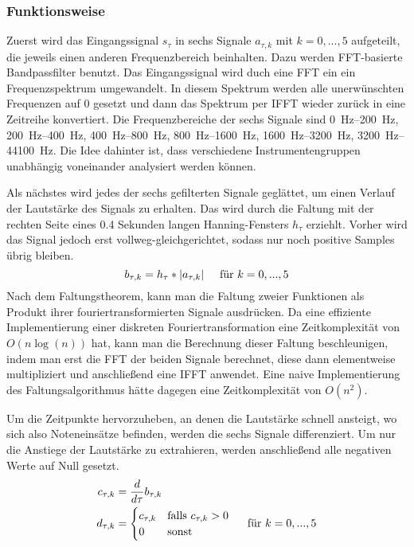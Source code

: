 {{		\subsubsection*{Funktionsweise}
		{
			Zuerst wird das Eingangssignal $s_\tau$ in sechs Signale $a_{\tau, k}$ mit $k = 0, ..., 5$ aufgeteilt,
				die jeweils einen anderen Frequenzbereich beinhalten.
			Dazu werden FFT-basierte Bandpassfilter benutzt.
			Das Eingangssignal wird duch eine FFT ein ein Frequenzspektrum umgewandelt.
			In diesem Spektrum werden alle unerwünschten Frequenzen auf \num{0} gesetzt
				und dann das Spektrum per IFFT wieder zurück in eine Zeitreihe konvertiert.
			Die Frequenzbereiche der sechs Signale sind
				\SIrange{0}{200}{\hertz}, \SIrange{200}{400}{\hertz},
				\SIrange{400}{800}{\hertz}, \SIrange{800}{1600}{\hertz},
				\SIrange{1600}{3200}{\hertz}, \SIrange{3200}{44100}{\hertz}.
			Die Idee dahinter ist,
				dass verschiedene Instrumentengruppen unabhängig voneinander analysiert werden können.

			Als nächstes wird jedes der sechs gefilterten Signale geglättet,
				um einen Verlauf der Lautstärke des Signals zu erhalten.
			Das wird durch die Faltung mit der rechten Seite eines \num{0.4} Sekunden langen Hanning-Fensters $h_\tau$ erziehlt.
			Vorher wird das Signal jedoch erst vollweg-gleichgerichtet,
				sodass nur noch positive Samples übrig bleiben.
			\begin{equation}
				b_{\tau, k} = h_\tau * |a_{\tau, k}| \text{\hspace{5mm}für } k = 0, ..., 5
			\end{equation}
			Nach dem Faltungstheorem,
				kann man die Faltung zweier Funktionen als Produkt ihrer fouriertransformierten Signale ausdrücken.
			Da eine effiziente Implementierung einer diskreten Fouriertransformation eine Zeitkomplexität von $O(n\log(n))$ hat,
				kann man die Berechnung dieser Faltung beschleunigen,
				indem man erst die FFT der beiden Signale berechnet,
				diese dann elementweise multipliziert
				und anschlie{\ss}end eine IFFT anwendet.
			Eine naive Implementierung des Faltungsalgorithmus hätte dagegen eine Zeitkomplexität von $O(n^2)$.

			Um die Zeitpunkte hervorzuheben,
				an denen die Lautstärke schnell ansteigt,
				wo sich also Noteneinsätze befinden,
				werden die sechs Signale differenziert.
			Um nur die Anstiege der Lautstärke zu extrahieren,
				werden anschlie{\ss}end alle negativen Werte auf Null gesetzt.
			\begin{align}
				c_{\tau, k} &= \frac{d}{d\tau} b_{\tau, k} \\
				d_{\tau, k} &=
					\begin{cases}
						c_{\tau, k} & \text{falls } c_{\tau, k} > 0 \\
						0           & \text{sonst}
					\end{cases}
					\text{\hspace{5mm}für } k = 0, ..., 5
			\end{align}

}}}
